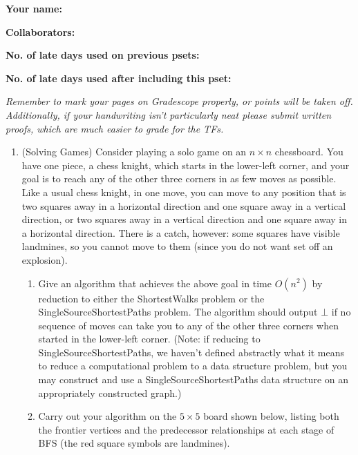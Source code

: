 \documentclass[11pt]{article}
\begin{document}

\textbf{Your name: }

\textbf{Collaborators: }

\textbf{No. of late days used on previous psets: }

\textbf{No. of late days used after including this pset: }

\medskip \noindent
\textit{Remember to mark your pages on Gradescope properly, or points will be taken off. Additionally, if your handwriting isn't particularly neat please submit written proofs, which are much easier to grade for the TFs.}

\begin{enumerate}
    \item (Solving Games) Consider playing a solo game on an $n\times n$ chessboard.  You have one piece, a chess knight, which starts in the lower-left corner, and your goal is to reach any of the other three corners in as few moves as possible.  Like a usual chess knight, in one move, you can move to any position that is two squares away in a horizontal direction and one square away in a vertical direction, or two squares away in a vertical direction and one square away in a horizontal direction.  There is a catch, however: some squares have visible landmines, so you cannot move to them (since you do not want set off an explosion). \

    \begin{enumerate}
    \item Give an algorithm that achieves the above goal in time $O(n^2)$ by reduction to either the ShortestWalks problem or the SingleSourceShortestPaths problem. The algorithm should output $\bot$ if no sequence of moves can take you to any of the other three corners when started in the lower-left corner. (Note: if reducing to SingleSourceShortestPaths, we haven't defined abstractly what it means to reduce a computational problem to a data structure problem, but you may construct and use a SingleSourceShortestPaths data structure on an appropriately constructed graph.)

    \item Carry out your algorithm on the $5\times 5$ board shown below, listing both the frontier vertices and the predecessor relationships at each stage of BFS (the red square symbols are landmines).
    
    \begin{figure} [H]
    \centering
\end{figure}
\end{enumerate}
\end{enumerate}
\end{document}
